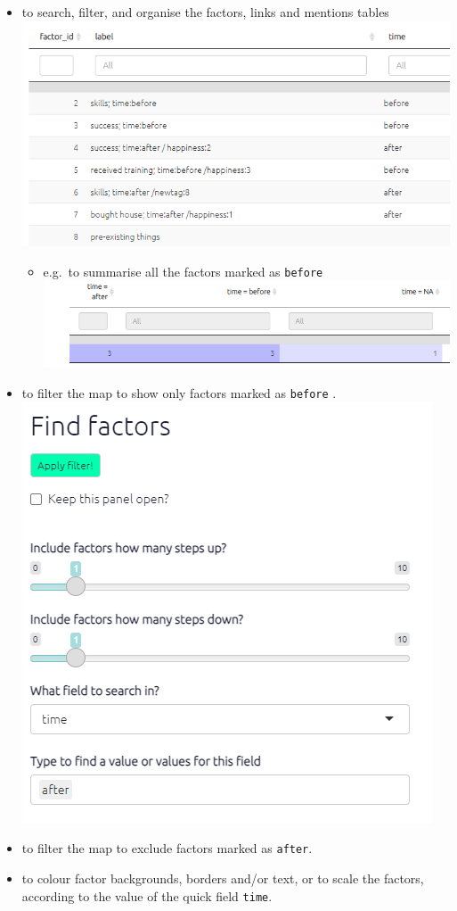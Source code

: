 \documentclass[
]{book}
\providecommand{\tightlist}{%
  \setlength{\itemsep}{0pt}\setlength{\parskip}{0pt}}
\begin{document}
\begin{itemize}
\tightlist
\item
  to search, filter, and organise the factors, links and mentions tables \includegraphics{_assets/image-20220124101850661.png}

  \begin{itemize}
  \tightlist
  \item
    e.g.~to summarise all the factors marked as \texttt{before} \includegraphics{_assets/image-20220124102017772.png}
  \end{itemize}
\item
  to filter the map to show only factors marked as \texttt{before} . \includegraphics{_assets/image-20220124102148729.png}
\item
  to filter the map to exclude factors marked as \texttt{after}.
\item
  to colour factor backgrounds, borders and/or text, or to scale the factors, according to the value of the quick field \texttt{time}.
\end{itemize}
\end{document}
